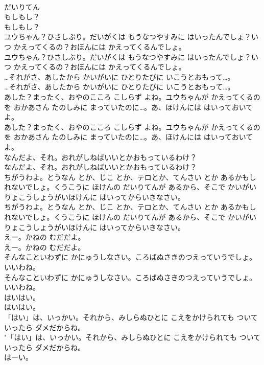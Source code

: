 \documentclass[8pt]{extreport}
\begin{document}
\begin{CJK}{UTF8}{min}
\\	だいりてん
\\	もしもし？	
\\	もしもし？ 
\\	ユウちゃん？ひさしぶり。だいがくは もうなつやすみに はいったんでしょ？いつ かえってくるの？おぼんには かえってくるんでしょ。	
\\	ユウちゃん？ひさしぶり。だいがくは もうなつやすみに はいったんでしょ？いつ かえってくるの？おぼんには かえってくるんでしょ。 
\\	…それがさ、あしたから かいがいに ひとりたびに いこうとおもって…。	
\\	…それがさ、あしたから かいがいに ひとりたびに いこうとおもって…。 
\\	あした？まったく、おやのこころ こしらず よね。ユウちゃんが かえってくるのを おかあさん たのしみに まっていたのに…。あ、ほけんには はいっておいてよ。	
\\	あした？まったく、おやのこころ こしらず よね。ユウちゃんが かえってくるのを おかあさん たのしみに まっていたのに…。あ、ほけんには はいっておいてよ。 
\\	なんだよ、それ。おれがしねばいいとかおもっているわけ？	
\\	なんだよ、それ。おれがしねばいいとかおもっているわけ？ 
\\	ちがうわよ。とうなん とか、じこ とか、テロとか、てんさい とか あるかもしれないでしょ。くうこうに ほけんの だいりてんが あるから、そこで かいがいりょこうしょうがいほけんに はいってからいきなさい。	
\\	ちがうわよ。とうなん とか、じこ とか、テロとか、てんさい とか あるかもしれないでしょ。くうこうに ほけんの だいりてんが あるから、そこで かいがいりょこうしょうがいほけんに はいってからいきなさい。 
\\	えー。かねの むだだよ。	
\\	えー。かねの むだだよ。 
\\	そんなこといわずに かにゅうしなさい。ころばぬさきのつえっていうでしょ。いいわね。	
\\	そんなこといわずに かにゅうしなさい。ころばぬさきのつえっていうでしょ。いいわね。 
\\	はいはい。	
\\	はいはい。 
\\	「はい」は、いっかい。それから、みしらぬひとに こえをかけられても ついていったら ダメだからね。	
\\	"「はい」は、いっかい。それから、みしらぬひとに こえをかけられても ついていったら ダメだからね。 
\\	はーい。	

\end{CJK}
\end{document}
